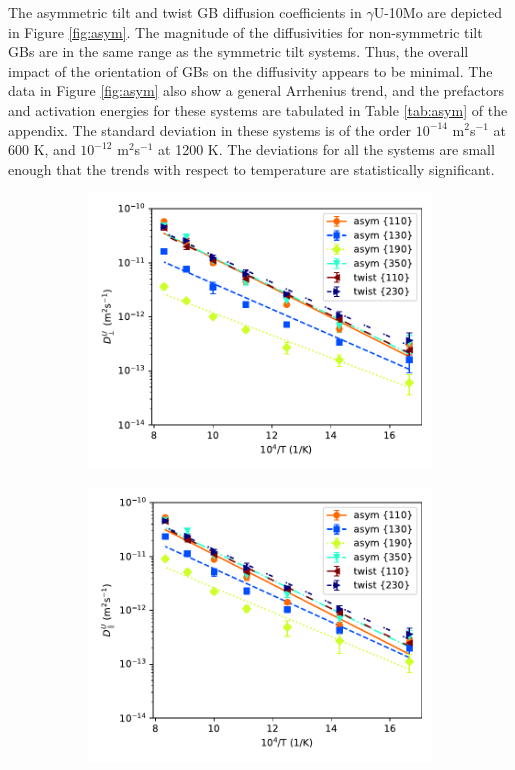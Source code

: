 \documentclass{elsarticle}
\begin{document}
The asymmetric tilt and twist GB diffusion coefficients in $\gamma$U-10Mo are depicted in Figure \ref{fig:asym}. The magnitude of the diffusivities for non-symmetric tilt GBs are in the same range as the symmetric tilt systems. Thus, the overall impact of the orientation of GBs on the diffusivity appears to be minimal. The data in Figure \ref{fig:asym} also show a general Arrhenius trend, and the prefactors and activation energies for these systems are tabulated in Table \ref{tab:asym} of the appendix. The standard deviation in these systems is of the order $10^{-14}$ m$^2$s$^{-1}$ at 600 K, and $ 10^{-12}$ m$^2$s$^{-1}$ at 1200 K. The deviations for all the systems are small enough that the trends with respect to temperature are statistically significant.

\begin{figure}[!ht]
\begin{subfigure}{0.49\textwidth}
	\centering
	\caption{}
	\includegraphics[width=\textwidth]{asym_twist_U_Dx.pdf}
\end{subfigure}
\begin{subfigure}{0.49\textwidth}
	\centering
	\caption{}
	\includegraphics[width=\textwidth]{asym_twist_U_Dz.pdf}
\end{subfigure}


\end{figure}
\end{document}

